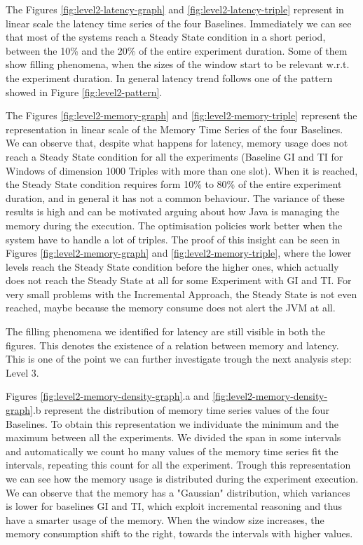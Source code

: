 The Figures \ref{fig:level2-latency-graph} and \ref{fig:level2-latency-triple} represent in linear scale the latency time series of the four Baselines. Immediately we can see that most of the systems reach a Steady State condition in a short period, between the 10\% and the 20\% of the entire experiment duration. Some of them show filling phenomena, when the sizes of the window start to be relevant w.r.t. the experiment duration. In general latency trend follows one of the pattern showed in Figure \ref{fig:level2-pattern}. %

The Figures \ref{fig:level2-memory-graph} and \ref{fig:level2-memory-triple} represent the  representation in linear scale of the Memory Time Series of the four Baselines. We can observe that, despite what happens for latency, memory usage does not reach a Steady State condition for all the experiments (Baseline GI and TI for Windows of dimension 1000 Triples with more than one slot).  When it is reached, the Steady State condition requires form 10\% to 80\% of the entire experiment duration, and in general it has not a common behaviour. The variance of these results is high and can be motivated arguing about how Java is managing the memory during the execution. The optimisation policies work better when the system have to handle a lot of triples. The proof of this insight can be seen in Figures \ref{fig:level2-memory-graph} and \ref{fig:level2-memory-triple}, where the lower levels reach the Steady State condition before the higher ones, which actually does not reach the Steady State at all for some Experiment with GI and TI.  For very small problems with the Incremental Approach, the Steady State is not even reached, maybe because the memory consume does not alert the JVM at all. 


The filling phenomena we identified for latency are still visible in both the figures. This denotes the existence of a relation between memory and latency. This is one of the point we can further investigate trough the next analysis step: Level 3.

Figures \ref{fig:level2-memory-density-graph}.a and \ref{fig:level2-memory-density-graph}.b represent the distribution of memory time series values of the four Baselines. To obtain this representation we individuate the minimum and the maximum between all the experiments. We divided the span in some intervals and automatically we count ho many values of the memory time series fit the intervals, repeating this count for all the experiment. Trough this representation we can see how the memory usage is distributed during the experiment execution. We can observe that the memory has a "Gaussian" distribution, which variances is lower for baselines GI and TI, which exploit incremental reasoning and thus have a smarter usage of the memory. When the window size increases, the memory consumption shift to the right, towards the intervals with higher values.

